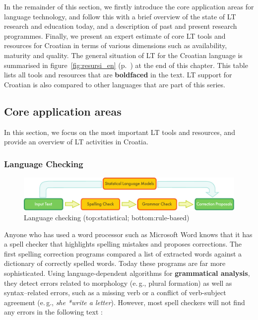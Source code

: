 \begin{multicols}{2}
In the remainder of this section, we firstly introduce the core application areas for language technology, and follow this with a brief overview of the state of LT research and education today, and a description of past and present research programmes. Finally, we present an expert estimate of core LT tools and resources for Croatian in terms of various dimensions such as availability, maturity and quality. The general situation of LT for the Croatian language is summarised in figure~\ref{fig:resursi_en} (p.~\pageref{fig:resursi_en}) at the end of this chapter. This table lists all tools and resources that are \textbf{boldfaced} in the text. LT support for Croatian is also compared to other languages that are part of this series.

\subsection{Core application areas}

In this section, we focus on the most important LT tools and resources, and provide an overview of LT activities in Croatia.

\subsubsection{Language Checking}

\begin{figure}[t]
  \center
  \includegraphics[width=\textwidth]{../_media/english/language_checking}
  \caption{Language checking (top:statistical; bottom:rule-based)}
  \label{fig:langcheckingaarch_en}
\end{figure}

Anyone who has used a word processor such as Microsoft Word knows that it has a spell checker that highlights spelling mistakes and proposes corrections. The first spelling correction programs compared a list of extracted words against a dictionary of correctly spelled words. Today these programs are far more sophisticated. Using language-dependent algorithms for \textbf{grammatical analysis}, they detect errors related to morphology (e.\,g., plural formation) as well as syntax--related errors, such as a missing verb or a conflict of verb-subject agreement (e.\,g., \textit{she *write a letter}). However, most spell checkers will not find any errors in the following text \cite{art11}:


\end{multicols}
